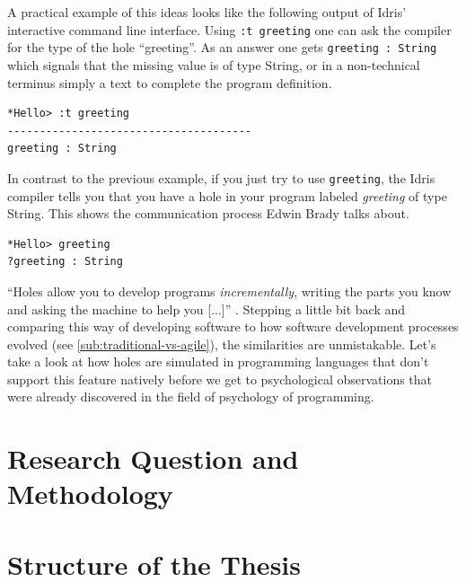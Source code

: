 A practical example of this ideas looks like the following output of Idris' interactive command line interface.
Using \verb|:t greeting| one can ask the compiler for the type of the hole ``greeting''.
As an answer one gets \verb|greeting : String| which signals that the missing value is of type String, or in a non-technical terminus simply a text to complete the program definition.

\begin{verbatim}
*Hello> :t greeting
--------------------------------------
greeting : String
\end{verbatim}

In contrast to the previous example, if you just try to use \verb|greeting|, the Idris compiler tells you that you have a hole in your program labeled \emph{greeting} of type String.
This shows the communication process Edwin Brady talks about.

\begin{verbatim}
*Hello> greeting
?greeting : String
\end{verbatim}

``Holes allow you to develop programs \emph{incrementally}, writing the parts you know and asking the machine to help you [...]'' \autocite[21]{brady_type-driven_2017}.
Stepping a little bit back and comparing this way of developing software to how software development processes evolved (see \cref{sub:traditional-vs-agile}), the similarities are unmistakable.
Let's take a look at how holes are simulated in programming languages that don't support this feature natively before we get to psychological observations that were already discovered in the field of psychology of programming.

\section[Research Question and Methodology]{Research Question and Methodology }

\section[Structure of the Thesis]{Structure of the Thesis }
